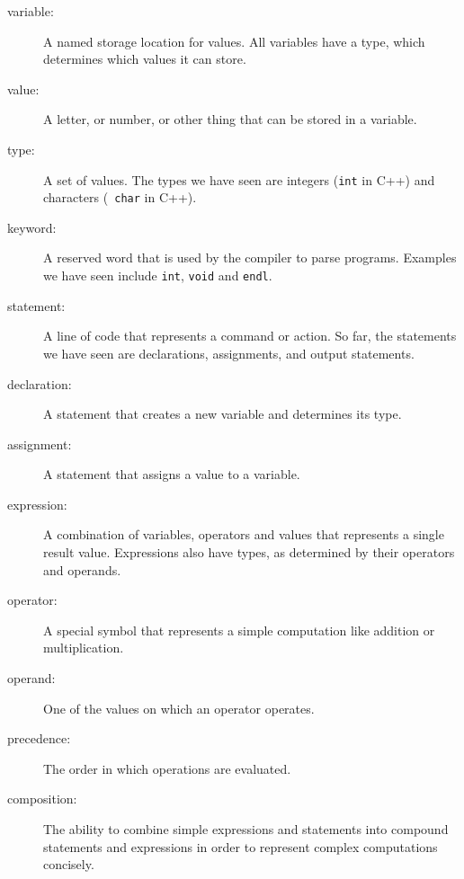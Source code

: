 \begin{description}

\item[variable:] A named storage location for values.  All
variables have a type, which determines which values it can
store.

\item[value:] A letter, or number, or other thing that can be
stored in a variable.  

\item[type:] A set of values.  The types
we have seen are integers ({\tt int} in C++) and characters ({\tt
char} in C++).

\item[keyword:]  A reserved word that is used by the compiler
to parse programs.  Examples we have seen include {\tt int},
{\tt void} and {\tt endl}.

\item[statement:] A line of code that represents a command or
action.  So far, the statements we have seen are declarations,
assignments, and output statements.

\item[declaration:] A statement that creates a new variable and
determines its type.

\item[assignment:] A statement that assigns a value to a variable.

\item[expression:] A combination of variables, operators and
values that represents a single result value.  Expressions also
have types, as determined by their operators and operands.

\item[operator:] A special symbol that represents a simple
computation like addition or multiplication.

\item[operand:] One of the values on which an operator operates. 

\item[precedence:] The order in which operations are evaluated.

\item[composition:] The ability to combine simple
expressions and statements into compound statements and expressions
in order to represent complex computations concisely.


\end{description}


